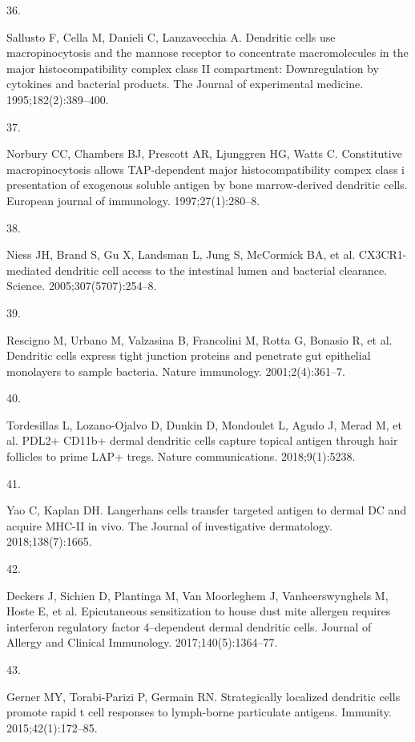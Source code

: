 \documentclass[
]{article}
\newlength{\cslhangindent}
\newlength{\csllabelwidth}
\newenvironment{CSLReferences}[2] %
 {\begin{list}{}{%
  \setlength{\itemindent}{0pt}
  \setlength{\leftmargin}{0pt}
  \setlength{\parsep}{0pt}
  \ifodd #1
   \setlength{\leftmargin}{\cslhangindent}
   \setlength{\itemindent}{-1\cslhangindent}
  \fi
  \setlength{\itemsep}{#2\baselineskip}}}
 {\end{list}}
\newcommand{\CSLLeftMargin}[1]{\parbox[t]{\csllabelwidth}{\strut#1\strut}}
\newcommand{\CSLRightInline}[1]{\parbox[t]{\linewidth - \csllabelwidth}{\strut#1\strut}}
\begin{document}
\begin{CSLReferences}{0}{1}
\CSLLeftMargin{36. }%
\CSLRightInline{Sallusto F, Cella M, Danieli C, Lanzavecchia A.
Dendritic cells use macropinocytosis and the mannose receptor to
concentrate macromolecules in the major histocompatibility complex class
II compartment: Downregulation by cytokines and bacterial products. The
Journal of experimental medicine. 1995;182(2):389--400. }

\CSLLeftMargin{37. }%
\CSLRightInline{Norbury CC, Chambers BJ, Prescott AR, Ljunggren HG,
Watts C. Constitutive macropinocytosis allows TAP-dependent major
histocompatibility compex class i presentation of exogenous soluble
antigen by bone marrow-derived dendritic cells. European journal of
immunology. 1997;27(1):280--8. }

\CSLLeftMargin{38. }%
\CSLRightInline{Niess JH, Brand S, Gu X, Landsman L, Jung S, McCormick
BA, et al. CX3CR1-mediated dendritic cell access to the intestinal lumen
and bacterial clearance. Science. 2005;307(5707):254--8. }

\CSLLeftMargin{39. }%
\CSLRightInline{Rescigno M, Urbano M, Valzasina B, Francolini M, Rotta
G, Bonasio R, et al. Dendritic cells express tight junction proteins and
penetrate gut epithelial monolayers to sample bacteria. Nature
immunology. 2001;2(4):361--7. }

\CSLLeftMargin{40. }%
\CSLRightInline{Tordesillas L, Lozano-Ojalvo D, Dunkin D, Mondoulet L,
Agudo J, Merad M, et al. PDL2+ CD11b+ dermal dendritic cells capture
topical antigen through hair follicles to prime LAP+ tregs. Nature
communications. 2018;9(1):5238. }

\CSLLeftMargin{41. }%
\CSLRightInline{Yao C, Kaplan DH. Langerhans cells transfer targeted
antigen to dermal DC and acquire MHC-II in vivo. The Journal of
investigative dermatology. 2018;138(7):1665. }

\CSLLeftMargin{42. }%
\CSLRightInline{Deckers J, Sichien D, Plantinga M, Van Moorleghem J,
Vanheerswynghels M, Hoste E, et al. Epicutaneous sensitization to house
dust mite allergen requires interferon regulatory factor 4--dependent
dermal dendritic cells. Journal of Allergy and Clinical Immunology.
2017;140(5):1364--77. }

\CSLLeftMargin{43. }%
\CSLRightInline{Gerner MY, Torabi-Parizi P, Germain RN. Strategically
localized dendritic cells promote rapid t cell responses to lymph-borne
particulate antigens. Immunity. 2015;42(1):172--85. }


\end{CSLReferences}
\end{document}
